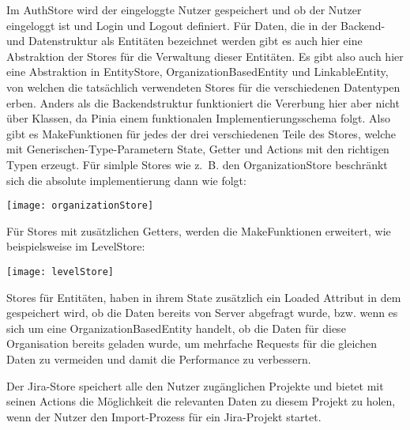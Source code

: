 Im AuthStore wird der eingeloggte Nutzer gespeichert und ob der Nutzer eingeloggt ist und Login und Logout definiert.
Für Daten, die in der Backend- und Datenstruktur als Entitäten bezeichnet werden gibt es auch hier eine Abstraktion der Stores für die Verwaltung dieser Entitäten. Es gibt also auch hier eine Abstraktion in EntityStore, OrganizationBasedEntity und LinkableEntity, von welchen die tatsächlich verwendeten Stores für die verschiedenen Datentypen erben. Anders als die Backendstruktur funktioniert die Vererbung hier aber nicht über Klassen, da Pinia einem funktionalen Implementierungsschema folgt. Also gibt es MakeFunktionen für jedes der drei verschiedenen Teile des Stores, welche mit Generischen-Type-Parametern State, Getter und Actions mit den richtigen Typen erzeugt. Für simlple Stores wie z. B. den OrganizationStore beschränkt sich die absolute implementierung dann wie folgt:

\vspace{20pt}
\begin{center}
    \begin{minipage}{1\linewidth}
        \texttt{[image: organizationStore]}
    \end{minipage}
\end{center}
\vspace{20pt}

Für Stores mit zusätzlichen Getters, werden die MakeFunktionen erweitert, wie beispielsweise im LevelStore:

\vspace{20pt}
\begin{center}
    \begin{minipage}{1\linewidth}
        \texttt{[image: levelStore]}
    \end{minipage}
\end{center}
\vspace{20pt}

Stores für Entitäten, haben in ihrem State zusätzlich ein Loaded Attribut in dem gespeichert wird, ob die Daten bereits von Server abgefragt wurde, bzw. wenn es sich um eine OrganizationBasedEntity handelt, ob die Daten für diese Organisation bereits geladen wurde, um mehrfache Requests für die gleichen Daten zu vermeiden und damit die Performance zu verbessern.

Der Jira-Store speichert alle den Nutzer zugänglichen Projekte und bietet mit seinen Actions die Möglichkeit die relevanten Daten zu diesem Projekt zu holen, wenn der Nutzer den Import-Prozess für ein Jira-Projekt startet.

